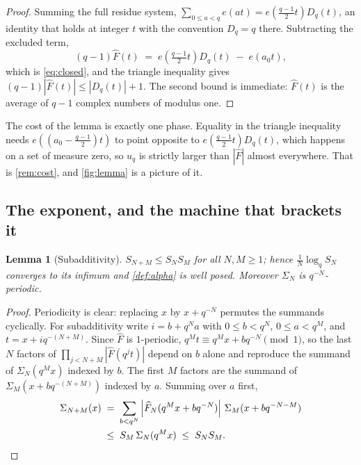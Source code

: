 \documentclass[11pt]{amsart}
\newtheorem{lemma}[theorem]{Lemma}
\theoremstyle{definition}
\theoremstyle{remark}
\begin{document}
\begin{proof}
Summing the full residue system, $\sum_{0 \le a < q} e(at) = e\!\left(\frac{q-1}{2}t\right)D_{q}(t)$, an identity that holds at integer $t$ with the convention $D_{q} = q$ there. Subtracting the excluded term,
\[
  (q-1)\widehat{F}(t) \;=\; e\!\left(\tfrac{q-1}{2}t\right)D_{q}(t) \;-\; e(a_{0}t),
\]
which is \cref{eq:closed}, and the triangle inequality gives $(q-1)|\widehat{F}(t)| \le |D_{q}(t)| + 1$. The second bound is immediate: $\widehat{F}(t)$ is the average of $q-1$ complex numbers of modulus one.
\end{proof}

The cost of the lemma is exactly one phase. Equality in the triangle inequality needs $e\!\left(\left(a_{0}-\frac{q-1}{2}\right)t\right)$ to point opposite to $e\!\left(\frac{q-1}{2}t\right)D_{q}(t)$, which happens on a set of measure zero, so $u_{q}$ is strictly larger than $|\widehat{F}|$ almost everywhere. That is \cref{rem:cost}, and \cref{fig:lemma} is a picture of it.

\subsection{The exponent, and the machine that brackets it}

\begin{lemma}[Subadditivity]
\label{lem:fekete}
$S_{N+M} \le S_{N}S_{M}$ for all $N, M \ge 1$; hence $\frac{1}{N}\log_{q}S_{N}$ converges to its infimum and \cref{def:alpha} is well posed. Moreover $\Sigma_{N}$ is $q^{-N}$-periodic.
\end{lemma}

\begin{proof}
Periodicity is clear: replacing $x$ by $x + q^{-N}$ permutes the summands cyclically. For subadditivity write $i = b + q^{N}a$ with $0 \le b < q^{N}$, $0 \le a < q^{M}$, and $t = x + i q^{-(N+M)}$. Since $\widehat{F}$ is $1$-periodic, $q^{M}t \equiv q^{M}x + b q^{-N} \pmod 1$, so the last $N$ factors of $\prod_{j<N+M}|\widehat{F}(q^{j}t)|$ depend on $b$ alone and reproduce the summand of $\Sigma_{N}(q^{M}x)$ indexed by $b$. The first $M$ factors are the summand of $\Sigma_{M}(x + bq^{-(N+M)})$ indexed by $a$. Summing over $a$ first,
\[
\begin{split}
  \Sigma_{N+M}(x) \;&=\; \sum_{b < q^{N}} \left|\widehat{F}_{N}(q^{M}x + bq^{-N})\right| \, \Sigma_{M}(x + bq^{-N-M}) \\
  \;&\le\; S_{M}\,\Sigma_{N}(q^{M}x) \;\le\; S_{N}S_{M} . \qedhere
\end{split}
\]
\end{proof}
\end{document}
